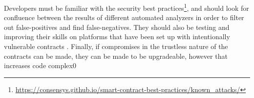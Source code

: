 
Developers must be familiar with the security best practices\footnote{\url{https://consensys.github.io/smart-contract-best-practices/known_attacks/}}, and should look for confluence between the results of different automated analyzers in order to filter out false-positives and find false-negatives. They should also be testing and improving their skills on platforms that have been set up with intentionally vulnerable contracts \cite{ethernaut, hackthiscontract, capturetheether}. Finally, if compromises in the trustless nature of the contracts can be made, they can be made to be upgradeable, however that increases code complex0